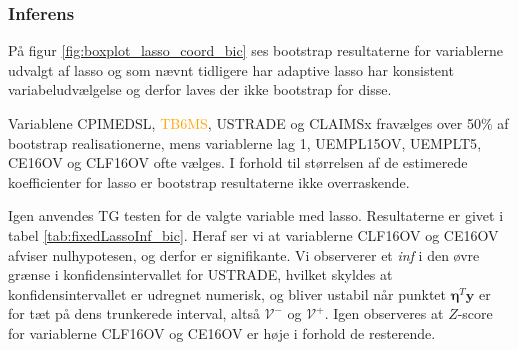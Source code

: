 \subsubsection{Inferens}
På figur \ref{fig:boxplot_lasso_coord_bic} ses bootstrap resultaterne for variablerne udvalgt af lasso og som nævnt tidligere har adaptive lasso har konsistent variabeludvælgelse og derfor laves der ikke bootstrap for disse. 

Variablene \textcolor{cadetblue2}{CPIMEDSL}, \textcolor{orange}{TB6MS}, \textcolor{blue3}{USTRADE} og \textcolor{blue3}{CLAIMSx} fravælges over 50\% af bootstrap realisationerne, mens variablerne \textcolor{blue3}{lag 1}, \textcolor{blue3}{UEMPL15OV}, \textcolor{blue3}{UEMPLT5}, \textcolor{blue3}{CE16OV} og \textcolor{blue3}{CLF16OV} ofte vælges.
I forhold til størrelsen af de estimerede koefficienter for lasso er bootstrap resultaterne ikke overraskende. 

Igen anvendes TG testen for de valgte variable med lasso.
Resultaterne er givet i tabel \ref{tab:fixedLassoInf_bic}.
Heraf ser vi at variablerne \textcolor{blue3}{CLF16OV} og \textcolor{blue3}{CE16OV} afviser nulhypotesen, og derfor er signifikante.
Vi observerer et \textit{inf} i den øvre grænse i konfidensintervallet for \textcolor{blue3}{USTRADE}, hvilket skyldes at konfidensintervallet er udregnet numerisk, og bliver ustabil når punktet $\boldsymbol\eta^T \mathbf{y}$ er for tæt på dens trunkerede interval, altså $\mathcal{V}^-$ og $\mathcal{V}^+$. 
Igen observeres at $Z$-score for variablerne \textcolor{blue3}{CLF16OV} og \textcolor{blue3}{CE16OV} er høje i forhold de resterende. 





